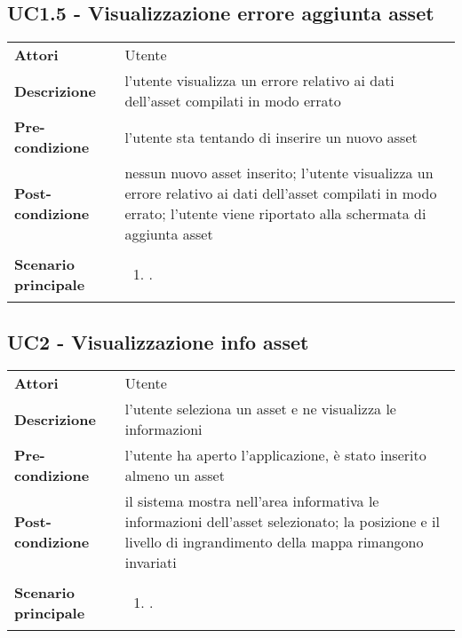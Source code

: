 \subsection{UC1.5 - Visualizzazione errore aggiunta asset} 
\label{sssec:UC1.5} 
\def\arraystretch{1.5}
\begin{tabularx}{\textwidth}{l|p{}}
	\rowcolor{I} \multicolumn{2}{c}{\color{white}\textbf{UC1.5 - Visualizzazione errore aggiunta asset}} \\
	\toprule
	\endhead
	\textbf{Attori} & Utente\\
	\textbf{Descrizione} & l'utente visualizza un errore relativo ai dati dell'asset compilati in modo errato\\
	\textbf{Pre-condizione} & l'utente sta tentando di inserire un nuovo asset\\
	\textbf{Post-condizione} & nessun nuovo asset inserito; l'utente visualizza un errore relativo ai dati dell'asset compilati in modo errato; l'utente viene riportato alla schermata di aggiunta asset\\
	\textbf{Scenario principale} & \vspace{-1.2em}\begin{enumerate}[leftmargin=*,noitemsep,nosep]
		\item \nameref{sssec:UC1.5}.
	\end{enumerate}\\
	\bottomrule
\end{tabularx}

\subsection{UC2 - Visualizzazione info asset} 
\label{sssec:UC2} 
\def\arraystretch{1.5}
\begin{tabularx}{\textwidth}{l|p{}}
	\rowcolor{I} \multicolumn{2}{c}{\color{white}\textbf{UC2 - Visualizzazione info asset}} \\
	\toprule
	\endhead
	\textbf{Attori} & Utente\\
	\textbf{Descrizione} & l'utente seleziona un asset e ne visualizza le informazioni\\
	\textbf{Pre-condizione} & l'utente ha aperto l'applicazione, è stato inserito almeno un asset\\
	\textbf{Post-condizione} & il sistema mostra nell'area informativa le informazioni dell'asset selezionato; la posizione e il livello di ingrandimento della mappa rimangono invariati\\
	\textbf{Scenario principale} & \vspace{-1.2em}\begin{enumerate}[leftmargin=*,noitemsep,nosep]
		\item \nameref{sssec:UC2}.
	\end{enumerate}\\
	\bottomrule
\end{tabularx}

